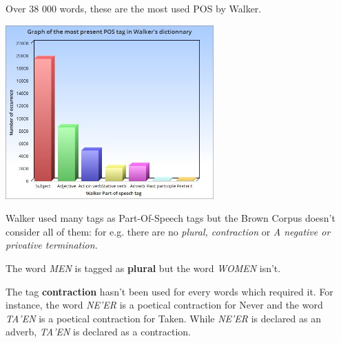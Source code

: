 \begin{center}
Over 38 000 words, these are the most used POS by Walker.
\vspace{2mm}

\includegraphics[width=8cm]{tagsetChart.jpeg}\\

\vspace{2mm}

Walker used many tags as Part-Of-Speech tags but the Brown Corpus doesn't consider all of them:
for e.g. there are no  \textit{plural, contraction} or \textit{A negative or privative termination.}\\

\vspace{2mm}

The word \textit{MEN} is tagged as \textbf{plural} but the word \textit{WOMEN} isn't.\\

\vspace{2mm}

The tag \textbf{contraction}  hasn't been used for every words which required it. For instance, the word \textit{NE'ER} is a poetical contraction for Never  and the word \textit{TA'EN} is a poetical contraction for Taken. While \textit{NE'ER} is declared as an adverb, \textit{TA'EN} is declared as a contraction.

\end{center}

